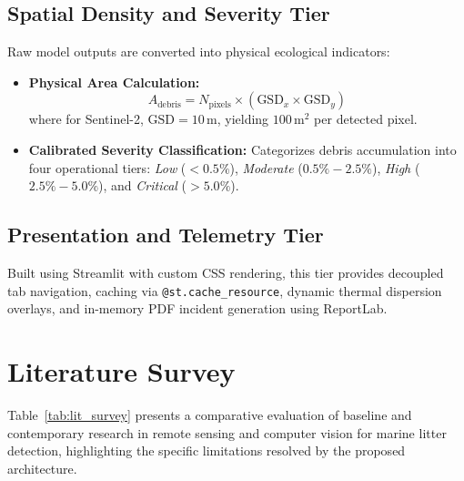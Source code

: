 \documentclass[conference]{IEEEtran}
\begin{document}
\subsection{Spatial Density and Severity Tier}
Raw model outputs are converted into physical ecological indicators:
\begin{itemize}
    \item \textbf{Physical Area Calculation:}
    \begin{equation}
        A_{\text{debris}} = N_{\text{pixels}} \times (\text{GSD}_x \times \text{GSD}_y)
    \end{equation}
    where for Sentinel-2, $\text{GSD} = 10\,\text{m}$, yielding $100\,\text{m}^2$ per detected pixel.
    \item \textbf{Calibrated Severity Classification:} Categorizes debris accumulation into four operational tiers: \textit{Low} ($<0.5\%$), \textit{Moderate} ($0.5\%-2.5\%$), \textit{High} ($2.5\%-5.0\%$), and \textit{Critical} ($>5.0\%$).
\end{itemize}

\subsection{Presentation and Telemetry Tier}
Built using Streamlit with custom CSS rendering, this tier provides decoupled tab navigation, caching via \texttt{@st.cache\_resource}, dynamic thermal dispersion overlays, and in-memory PDF incident generation using ReportLab.

\clearpage

\section{Literature Survey}

Table~\ref{tab:lit_survey} presents a comparative evaluation of baseline and contemporary research in remote sensing and computer vision for marine litter detection, highlighting the specific limitations resolved by the proposed architecture.
\end{document}
